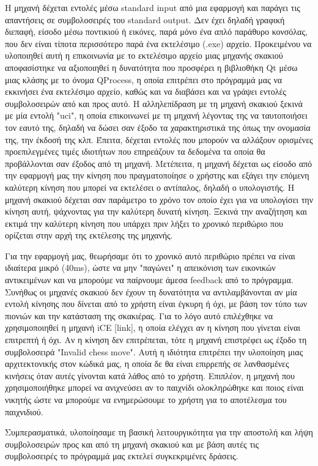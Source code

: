 Η μηχανή δέχεται εντολές μέσω standard input από μια εφαρμογή και παράγει τις απαντήσεις σε συμβολοσειρές του standard output. Δεν έχει δηλαδή γραφική διεπαφή, είσοδο μέσω ποντικιού ή εικόνες, παρά μόνο ένα απλό παράθυρο κονσόλας, που δεν είναι τίποτα περισσότερο παρά ένα εκτελέσιμο (.exe) αρχείο. Προκειμένου να υλοποιηθεί αυτή η επικοινωνία με το εκτελέσιμο αρχείο μιας μηχανής σκακιού αποφασίστηκε να αξιοποιηθεί η δυνατότητα που προσφέρει η βιβλιοθήκη Qt μέσω μιας κλάσης με το όνομα QProcess, η οποία επιτρέπει στο πρόγραμμά μας να εκκινήσει ένα εκτελέσιμο αρχείο, καθώς και να διαβάσει και να γράψει εντολές συμβολοσειρών από και προς αυτό. Η αλληλεπίδραση με τη μηχανή σκακιού ξεκινά με μία εντολή "uci", η οποία επικοινωνεί με τη μηχανή λέγοντας της να ταυτοποιήσει τον εαυτό της, δηλαδή να δώσει σαν έξοδο τα χαρακτηριστικά της όπως την ονομασία της, την έκδοσή της κλπ.  Έπειτα, δέχεται εντολές που μπορούν να αλλάξουν ορισμένες προεπιλεγμένες τιμές ιδιοτήτων που επηρεάζουν τα δεδομένα τα οποία θα προβάλλονται σαν έξοδος από τη μηχανή. Μετέπειτα, η μηχανή δέχεται ως είσοδο από την εφαρμογή μας την κίνηση που πραγματοποίησε ο χρήστης και εξάγει την επόμενη καλύτερη κίνηση που μπορεί να εκτελέσει ο αντίπαλος, δηλαδή ο υπολογιστής.
Η μηχανή σκακιού δέχεται σαν παράμετρο το χρόνο τον οποίο έχει για να υπολογίσει την κίνηση αυτή, ψάχνοντας για την καλύτερη δυνατή κίνηση. Ξεκινά την αναζήτηση και εκτιμά την καλύτερη κίνηση που υπάρχει πριν λήξει το χρονικό περιθώριο που ορίζεται στην αρχή της εκτέλεσης της μηχανής. 

Για την εφαρμογή μας, θεωρήσαμε ότι το χρονικό αυτό περιθώριο πρέπει να είναι ιδιαίτερα μικρό (40ms), ώστε να μην "παγώνει" η απεικόνιση των εικονικών αντικειμένων και να μπορούμε να παίρνουμε άμεσα feedback από το πρόγραμμα. Συνήθως οι μηχανές σκακιού δεν έχουν τη δυνατότητα να αντιλαμβάνονται αν μία εντολή κίνησης που δίνεται από το χρήστη είναι έγκυρη ή όχι, με βάση τον τύπο των πιονιών και την κατάσταση της σκακιέρας. Για το λόγο αυτό επιλέχθηκε να χρησιμοποιηθεί η μηχανή iCE [link], η οποία ελέγχει αν η κίνηση που γίνεται είναι επιτρεπτή ή όχι. Αν η κίνηση δεν επιτρέπεται, τότε η μηχανή επιστρέφει ως έξοδο τη συμβολοσειρά "Invalid chess move". Αυτή η ιδιότητα επιτρέπει την υλοποίηση μιας αρχιτεκτονικής στον κώδικά μας, η οποία δε θα είναι επιρρεπής σε λανθασμένες κινήσεις όταν αυτές γίνονται κατά λάθος από το χρήστη. Επιπλέον, η μηχανή που χρησιμοποιήθηκε μπορεί να ανιχνεύσει αν το παιχνίδι ολοκληρώθηκε και ποιος είναι νικητής ώστε να μπορούμε να ενημερώσουμε το χρήστη για το αποτέλεσμα του παιχνιδιού. 

Συμπερασματικά, υλοποίησαμε τη βασική λειτουργικότητα για την αποστολή και λήψη συμβολοσειρών προς και από τη μηχανή σκακιού και με βάση αυτές τις συμβολοσειρές το πρόγραμμά μας εκτελεί συγκεκριμένες δράσεις.










